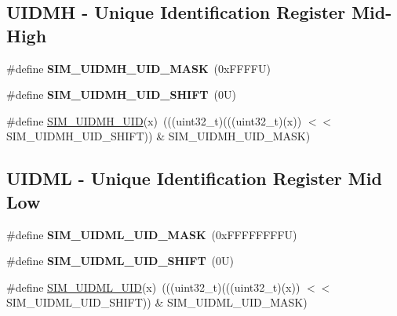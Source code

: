 \subsection*{U\+I\+D\+MH -\/ Unique Identification Register Mid-\/\+High}
\begin{DoxyCompactItemize}
\item 
\mbox{\label{group___s_i_m___register___masks_ga38dffcb27b09a015e2f2e7812d42477c}} 
\#define {\bfseries S\+I\+M\+\_\+\+U\+I\+D\+M\+H\+\_\+\+U\+I\+D\+\_\+\+M\+A\+SK}~(0x\+F\+F\+F\+F\+U)
\item 
\mbox{\label{group___s_i_m___register___masks_ga56b83da182908eb5c406181b72870e54}} 
\#define {\bfseries S\+I\+M\+\_\+\+U\+I\+D\+M\+H\+\_\+\+U\+I\+D\+\_\+\+S\+H\+I\+FT}~(0\+U)
\item 
\#define \mbox{\hyperlink{group___s_i_m___register___masks_ga62269c010d4ee5e3036fea63bbe21702}{S\+I\+M\+\_\+\+U\+I\+D\+M\+H\+\_\+\+U\+ID}}(x)~(((uint32\+\_\+t)(((uint32\+\_\+t)(x)) $<$$<$ S\+I\+M\+\_\+\+U\+I\+D\+M\+H\+\_\+\+U\+I\+D\+\_\+\+S\+H\+I\+FT)) \& S\+I\+M\+\_\+\+U\+I\+D\+M\+H\+\_\+\+U\+I\+D\+\_\+\+M\+A\+SK)
\end{DoxyCompactItemize}
\subsection*{U\+I\+D\+ML -\/ Unique Identification Register Mid Low}
\begin{DoxyCompactItemize}
\item 
\mbox{\label{group___s_i_m___register___masks_ga87fba538d2482490ddfdb1ef8a44ec66}} 
\#define {\bfseries S\+I\+M\+\_\+\+U\+I\+D\+M\+L\+\_\+\+U\+I\+D\+\_\+\+M\+A\+SK}~(0x\+F\+F\+F\+F\+F\+F\+F\+F\+U)
\item 
\mbox{\label{group___s_i_m___register___masks_gacedaca5a049852ee395767e70f806c14}} 
\#define {\bfseries S\+I\+M\+\_\+\+U\+I\+D\+M\+L\+\_\+\+U\+I\+D\+\_\+\+S\+H\+I\+FT}~(0\+U)
\item 
\#define \mbox{\hyperlink{group___s_i_m___register___masks_ga0eb63e00b9ee42283435043b437b8d29}{S\+I\+M\+\_\+\+U\+I\+D\+M\+L\+\_\+\+U\+ID}}(x)~(((uint32\+\_\+t)(((uint32\+\_\+t)(x)) $<$$<$ S\+I\+M\+\_\+\+U\+I\+D\+M\+L\+\_\+\+U\+I\+D\+\_\+\+S\+H\+I\+FT)) \& S\+I\+M\+\_\+\+U\+I\+D\+M\+L\+\_\+\+U\+I\+D\+\_\+\+M\+A\+SK)
\end{DoxyCompactItemize}
